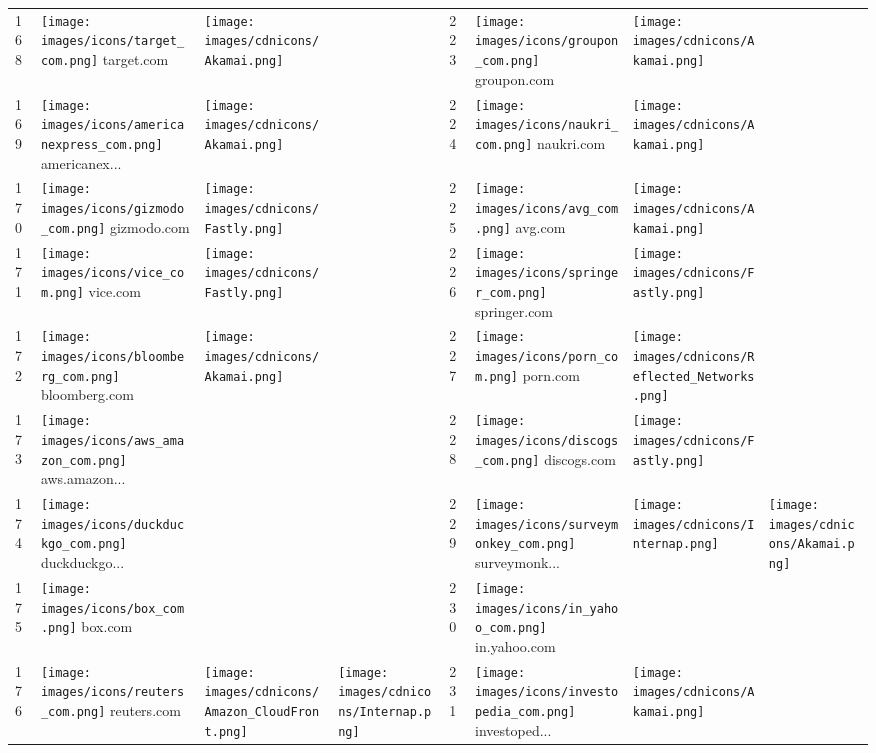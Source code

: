 \begin{table}[tbp]
\begin{tabular}{|llll|llll|}
168 & \texttt{[image: images/icons/target\_com.png]} target.com & \texttt{[image: images/cdnicons/Akamai.png]} & & 223 & \texttt{[image: images/icons/groupon\_com.png]} groupon.com & \texttt{[image: images/cdnicons/Akamai.png]} & \\
169 & \texttt{[image: images/icons/americanexpress\_com.png]} americanex... & \texttt{[image: images/cdnicons/Akamai.png]} & & 224 & \texttt{[image: images/icons/naukri\_com.png]} naukri.com & \texttt{[image: images/cdnicons/Akamai.png]} & \\
170 & \texttt{[image: images/icons/gizmodo\_com.png]} gizmodo.com & \texttt{[image: images/cdnicons/Fastly.png]} & & 225 & \texttt{[image: images/icons/avg\_com.png]} avg.com & \texttt{[image: images/cdnicons/Akamai.png]} & \\
171 & \texttt{[image: images/icons/vice\_com.png]} vice.com & \texttt{[image: images/cdnicons/Fastly.png]} & & 226 & \texttt{[image: images/icons/springer\_com.png]} springer.com & \texttt{[image: images/cdnicons/Fastly.png]} & \\
172 & \texttt{[image: images/icons/bloomberg\_com.png]} bloomberg.com & \texttt{[image: images/cdnicons/Akamai.png]} & & 227 & \texttt{[image: images/icons/porn\_com.png]} porn.com & \texttt{[image: images/cdnicons/Reflected\_Networks.png]} & \\
173 & \texttt{[image: images/icons/aws\_amazon\_com.png]} aws.amazon... & & & 228 & \texttt{[image: images/icons/discogs\_com.png]} discogs.com & \texttt{[image: images/cdnicons/Fastly.png]} & \\
174 & \texttt{[image: images/icons/duckduckgo\_com.png]} duckduckgo... & & & 229 & \texttt{[image: images/icons/surveymonkey\_com.png]} surveymonk... & \texttt{[image: images/cdnicons/Internap.png]} & \texttt{[image: images/cdnicons/Akamai.png]} \\
175 & \texttt{[image: images/icons/box\_com.png]} box.com & & & 230 & \texttt{[image: images/icons/in\_yahoo\_com.png]} in.yahoo.com & & \\
176 & \texttt{[image: images/icons/reuters\_com.png]} reuters.com & \texttt{[image: images/cdnicons/Amazon\_CloudFront.png]} & \texttt{[image: images/cdnicons/Internap.png]} & 231 & \texttt{[image: images/icons/investopedia\_com.png]} investoped... & \texttt{[image: images/cdnicons/Akamai.png]} & \\

\end{tabular}
\end{table}
